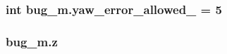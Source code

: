 \subsubsection[{\texorpdfstring{yaw\+\_\+error\+\_\+allowed\+\_\+}{yaw_error_allowed_}}]{\setlength{\rightskip}{0pt plus 5cm}int bug\+\_\+m.\+yaw\+\_\+error\+\_\+allowed\+\_\+ = 5}\hypertarget{namespacebug__m_a23e5e76f14d9d0d139767cb229a53dda}{}\label{namespacebug__m_a23e5e76f14d9d0d139767cb229a53dda}
\subsubsection[{\texorpdfstring{z}{z}}]{\setlength{\rightskip}{0pt plus 5cm}bug\+\_\+m.\+z}\hypertarget{namespacebug__m_afbb54887da57b97920c8d36c6daed1fc}{}\label{namespacebug__m_afbb54887da57b97920c8d36c6daed1fc}
